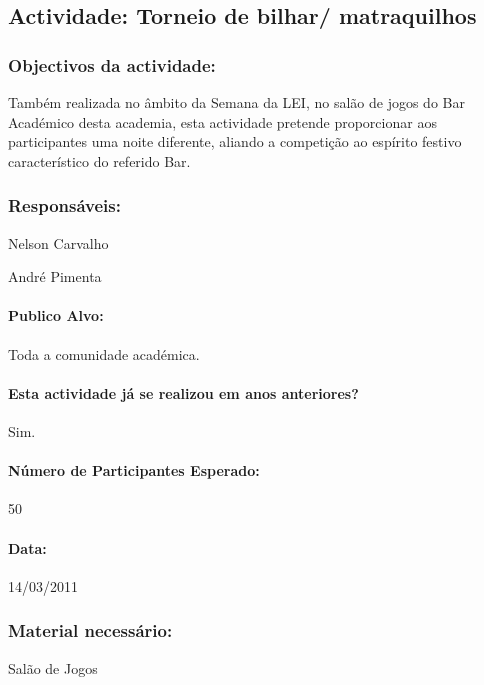 \subsection{Actividade: Torneio de bilhar/ matraquilhos} %

\subsubsection*{Objectivos da actividade:}
Também realizada no âmbito da Semana da LEI, no salão de jogos do Bar Académico desta academia, esta actividade pretende proporcionar aos participantes uma noite diferente, aliando a competição ao espírito festivo característico do referido Bar.

\subsubsection*{Responsáveis:}
\begin{itemizedash}
	\item{Nelson Carvalho}
	\item{André Pimenta}
\end{itemizedash}

\paragraph{Publico Alvo: }
Toda a comunidade académica.
\paragraph{Esta actividade já se realizou em anos anteriores?}
Sim.

\paragraph{Número de Participantes Esperado:}
50

\paragraph{Data:} 14/03/2011

\subsubsection*{Material necessário:}
\begin{itemizedash}
	\item{Salão de Jogos}
\end{itemizedash}

